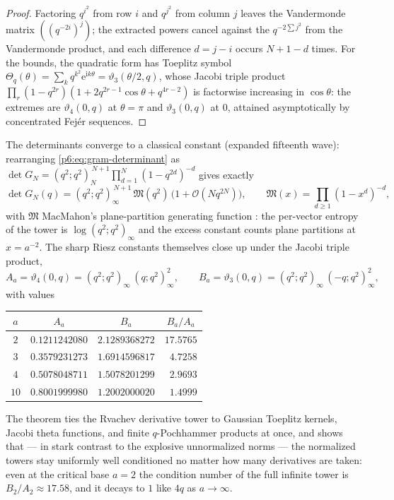 \documentclass[11pt,oneside]{article}
\numberwithin{equation}{section}
\theoremstyle{definition}
\theoremstyle{remark}
\newcommand{\e}{\mathrm e}
\newcommand{\ii}{\mathrm i}
\newcommand{\bigO}{\mathcal O}
\begin{document}
\begin{proof}
Factoring $q^{i^2}$ from row $i$ and $q^{j^2}$ from column $j$ leaves the
Vandermonde matrix $((q^{-2i})^j)$; the extracted powers cancel against the
$q^{-2\sum j^2}$ from the Vandermonde product, and each difference $d=j-i$
occurs $N+1-d$ times.  For the bounds, the quadratic form has Toeplitz symbol
$\Theta_q(\theta)=\sum_kq^{k^2}\e^{\ii k\theta}=\vartheta_3(\theta/2,q)$,
whose Jacobi triple product
$\prod_r(1-q^{2r})(1+2q^{2r-1}\cos\theta+q^{4r-2})$ is factorwise increasing
in $\cos\theta$: the extremes are $\vartheta_4(0,q)$ at $\theta=\pi$ and
$\vartheta_3(0,q)$ at $0$, attained asymptotically by concentrated Fej\'er
sequences.
\end{proof}

The determinants converge to a classical constant (expanded fifteenth wave):
rearranging \eqref{p6:eq:gram-determinant} as
$\det G_N=(q^2;q^2)_N^{\,N+1}\prod_{d=1}^N(1-q^{2d})^{-d}$ gives exactly
\begin{equation}\label{p6:eq:macmahon}
 \det G_N(q)
 =(q^2;q^2)_\infty^{\,N+1}\,
 \mathfrak M(q^2)\,\bigl(1+\bigO(Nq^{2N})\bigr),
 \qquad
 \mathfrak M(x)=\prod_{d\ge1}(1-x^d)^{-d},
\end{equation}
with $\mathfrak M$ MacMahon's plane-partition generating function
\cite{p6:andrews}: the per-vector entropy of the tower is
$\log(q^2;q^2)_\infty$ and the excess constant counts plane partitions at
$x=a^{-2}$.  The sharp Riesz constants themselves close up under the Jacobi
triple product,
\begin{equation}\label{p6:eq:riesz-triple}
 A_a=\vartheta_4(0,q)=(q^2;q^2)_\infty\,(q;q^2)_\infty^2,
 \qquad
 B_a=\vartheta_3(0,q)=(q^2;q^2)_\infty\,(-q;q^2)_\infty^2,
\end{equation}
with values
\begin{center}
\begin{tabular}{cccc}
\toprule
$a$ & $A_a$ & $B_a$ & $B_a/A_a$\\
\midrule
$2$  & $0.1211242080$ & $2.1289368272$ & $17.5765$\\
$3$  & $0.3579231273$ & $1.6914596817$ & $\phantom{1}4.7258$\\
$4$  & $0.5078048711$ & $1.5078201299$ & $\phantom{1}2.9693$\\
$10$ & $0.8001999980$ & $1.2002000020$ & $\phantom{1}1.4999$\\
\bottomrule
\end{tabular}
\end{center}
The theorem ties the Rvachev derivative tower to Gaussian
Toeplitz kernels, Jacobi theta functions, and finite $q$-Pochhammer products
at once, and shows that --- in stark contrast to the explosive unnormalized
norms --- the normalized towers stay uniformly well conditioned no matter how
many derivatives are taken: even at the critical base $a=2$ the condition
number of the full infinite tower is $B_2/A_2\approx17.58$, and it decays to
$1$ like $4q$ as $a\to\infty$.
\end{document}
